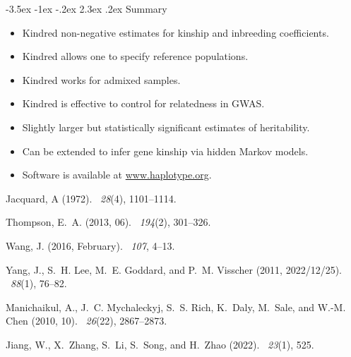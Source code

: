 \documentclass[portrait]{a0poster}
\makeatletter
\renewcommand\section{\@startsection {section}{1}{\z@}%
                                   {-3.5ex \@plus -1ex \@minus -.2ex}%
                                   {2.3ex \@plus.2ex}%
                                   {\Large\bfseries\sc\color{blue}}}
\makeatother
\begin{document}
\begin{multicols}{3}
{}


\section{Summary}
\begin{itemize}
\item Kindred non-negative estimates for kinship and inbreeding coefficients. 
\item Kindred allows one to specify reference populations. 
\item Kindred works for admixed samples. 
\item Kindred is effective to control for relatedness in GWAS. 
\item Slightly larger but statistically significant estimates of heritability. 
\item Can be extended to infer gene kinship via hidden Markov models. 
\item Software is available at \url{www.haplotype.org}. 
\end{itemize}





\vspace{-.3in}
\begin{thebibliography}{natbib}
{\small
\bibitem[Jacquard]{}
 Jacquard, A (1972).
~{\em 28\/}(4), 1101--1114.

\bibitem[Thompson]{}
Thompson, E.~A. (2013, 06).
~{\em 194\/}(2), 301--326.

\bibitem[Wang]{}
Wang, J. (2016, February).
~{\em 107}, 4--13.

\bibitem[GCTA]{}
Yang, J., S.~H. Lee, M.~E. Goddard, and P.~M. Visscher (2011, 2022/12/25).
~{\em 88\/}(1), 76--82.

\bibitem[King]{}
Manichaikul, A., J.~C. Mychaleckyj, S.~S. Rich, K.~Daly, M.~Sale, and W.-M.
  Chen (2010, 10).
~{\em 26\/}(22), 2867--2873.

\bibitem[UKin]{}
Jiang, W., X.~Zhang, S.~Li, S.~Song, and H.~Zhao (2022).
~{\em 23\/}(1), 525.

}
\end{thebibliography}


\end{multicols}
\end{document}
